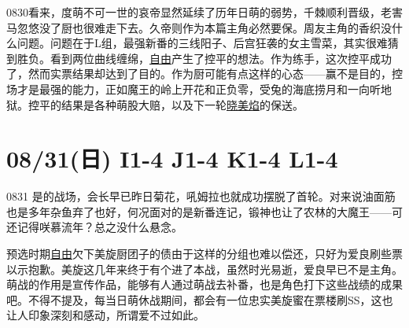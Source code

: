 0830看来，度萌不可一世的哀帝显然延续了历年日萌的弱势，千棘顺利晋级，老害马忽悠没了厨也很难走下去。久帝则作为本篇主角必然要保。周友主角的香织没什么问题。问题在于L组，最强新番的三线阳子、后宫狂袭的女主雪菜，其实很难猜到胜负。看到两位曲线缠绵，\uline{自由}产生了控平的想法。作为练手，这次控平成功了，然而实票结果却达到了目的。作为厨可能有点这样的心态——赢不是目的，控场才是最强的能力，正如魔王的岭上开花和正负零，受兔的海底捞月和一向听地狱。控平的结果是各种萌股大赔，以及下一轮\uline{晓美焰}的保送。

\section{08/31(日) I1-4 J1-4 K1-4 L1-4}


0831 是的战场，会长早已昨日菊花，吼姆拉也就成功摆脱了首轮。对来说油面筋也是多年杂鱼弃了也好，何况面对的是新番连记，锻神也让了农林的大魔王——可还记得咲慕流年？总之没什么悬念。

预选时期\uline{自由}欠下美旋厨团子的债由于这样的分组也难以偿还，只好为爱良刷些票以示抱歉。美旋这几年来终于有个进了本战，虽然时光易逝，爱良早已不是主角。萌战的作用是宣传作品，能够有人通过萌战去补番，也是角色打下这些战绩的成果吧。不得不提及，每当日萌休战期间，都会有一位忠实美旋蜜在票楼刷SS，这也让人印象深刻和感动，所谓爱不过如此。

